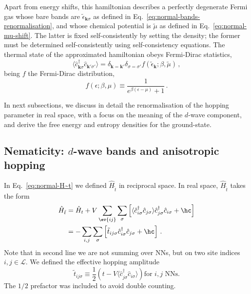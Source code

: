 Apart from energy shifts, this hamiltonian describes a perfectly degenerate Fermi gas whose bare bands are $\tilde{\epsilon}_{\mathbf{k}\sigma}$ as defined in Eq.~\eqref{eq:normal-bands-renormalisation}, and whose chemical potential is $\tilde{\mu}$ as defined in Eq.~\eqref{eq:normal-mu-shift}. The latter is fixed self-consistently by setting the density; the former must be determined self-consistently using self-consistency equations. The thermal state of the approximated hamiltonian obeys Fermi-Dirac statistics,
\begin{equation}\label{eq:normal-<cc>-FD}
	\langle \hat c_{\mathbf{k}\sigma}^\dagger \hat c_{\mathbf{k}'\sigma'} \rangle = \delta_{\mathbf{k}=\mathbf{k}'} \delta_{\sigma=\sigma'} f(\tilde{\epsilon}_\mathbf{k};\beta,\tilde{\mu}) \, ,
\end{equation}
being $f$ the Fermi-Dirac distribution,
\[
	f(\epsilon;\beta,\mu) \equiv \frac{1}{e^{\beta(\epsilon-\mu)}+1} \, .
\]

In next subsections, we discuss in detail the renormalisation of the hopping parameter in real space, with a focus on the meaning of the $d$-wave component, and derive the free energy and entropy densities for the ground-state.

\subsection{Nematicity: $d$-wave bands and anisotropic hopping}\label{subsec:normal-d-wave-hopping}

In Eq.~\eqref{eq:normal-H~t} we defined $\hat H_{\tilde{t}}$ in reciprocal space. In real space, $\hat H_{\tilde{t}}$ takes the form
\[
\begin{aligned}
	\hat H_{\tilde{t}} &= \hat H_t + V \sum_{\ev{ij}} \sum_\sigma \left[
	\langle
	\hat c_{i\sigma}^\dagger \hat c_{j\sigma}
	\rangle \hat c_{j\sigma}^\dagger  \hat c_{i\sigma} + \hc
	\right] \\
	&= - \sum_{i,j} \sum_\sigma 
	\left[
	\tilde{t}_{ij\sigma} \hat c_{i\sigma}^\dagger \hat c_{j\sigma} + \hc
	\right] \, .
\end{aligned}
\]
Note that in second line we are not summing over NNs, but on two site indices $i,j \in \mathcal{L}$. We defined the effective hopping amplitude
\[
	\tilde{t}_{ij\sigma} \equiv \frac{1}{2} \left(
		t - V \langle
		\hat c_{j\sigma}^\dagger \hat c_{i\sigma} \rangle
	\right)
	\text{for $i,j$ NNs.}
\]
The $1/2$ prefactor was included to avoid double counting.

